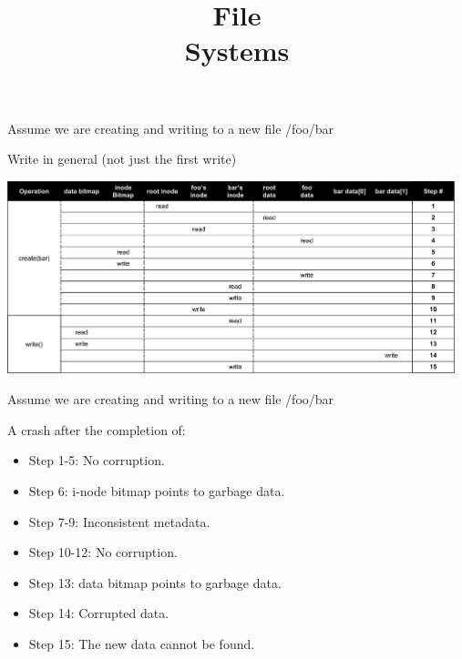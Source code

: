 

\title{File\\Systems}



\begin{frame}
    \titlepage
\end{frame}

\begin{slide}


    Assume we are creating and writing to a new file /foo/bar

    Write in general (not just the first write)
    \medskip

    \includegraphics[width=130mm]{system-crash-1.png}

\end{slide}

\begin{slide}

    
    Assume we are creating and writing to a new file /foo/bar
    \bigskip

    A crash after the completion of:
    \begin{itemize}
        \item Step   1-5: No corruption.
        \item Step     6: i-node bitmap points to garbage data.
        \item Step   7-9: Inconsistent metadata.
        \item Step 10-12: No corruption.  
        \item Step    13: data bitmap points to garbage data.
        \item Step    14: Corrupted data.
        \item Step    15: The new data cannot be found. 
    \end{itemize}

\end{slide}


